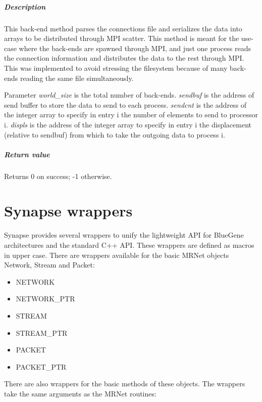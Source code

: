 \documentclass[twoside,a4,english,11pt]{book}
\begin{document}
\paragraph{Description}
  This back-end method parses the connections file and serializes the data into arrays to be distributed through 
  MPI scatter. This method is meant for the use-case where the back-ends are spawned through MPI, and just one 
  process reads the connection information and distributes the data to the rest through MPI. This was implemented 
  to avoid stressing the filesystem because of many back-ends reading the same file simultaneously.

  Parameter \emph{world\_size} is the total number of back-ends. \emph{sendbuf} is the address of send buffer to 
  store the data to send to each process. \emph{sendcnt} is the address of the integer array to specify in entry 
  i the number of elements to send to processor i. \emph{displs} is the address of the integer array to specify 
  in entry i the displacement (relative to sendbuf) from which to take the outgoing data to process i.
  
\paragraph{Return value}
  Returns 0 on success; -1 otherwise.

\chapter{Synapse wrappers}

Synapse provides several wrappers to unify the lightweight API for BlueGene architectures and the standard C++ API. 
These wrappers are defined as macros in upper case. There are wrappers available for the basic MRNet objects Network, Stream and Packet:

\begin{itemize}
 \item NETWORK     
 \item NETWORK\_PTR
 \item STREAM     
 \item STREAM\_PTR
 \item PACKET     
 \item PACKET\_PTR
\end{itemize}

There are also wrappers for the basic methods of these objects. The wrappers take the same arguments as 
the MRNet routines:
\end{document}
